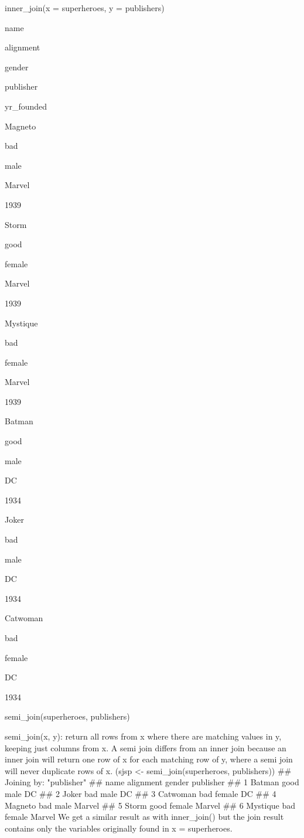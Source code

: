inner_join(x = superheroes, y = publishers)
 


name
 
alignment
 
gender
 
publisher
 
yr_founded
 



Magneto
 
bad
 
male
 
Marvel
 
1939
 


Storm
 
good
 
female
 
Marvel
 
1939
 


Mystique
 
bad
 
female
 
Marvel
 
1939
 


Batman
 
good
 
male
 
DC
 
1934
 


Joker
 
bad
 
male
 
DC
 
1934
 


Catwoman
 
bad
 
female
 
DC
 
1934
 



semi_join(superheroes, publishers)
 

semi_join(x, y): return all rows from x where there are matching values in y, keeping just columns from x. A semi join differs from an inner join because an inner join will return one row of x for each matching row of y, where a semi join will never duplicate rows of x.
 (sjsp <- semi_join(superheroes, publishers)) ## Joining by: "publisher" ##       name alignment gender publisher
## 1   Batman      good   male        DC
## 2    Joker       bad   male        DC
## 3 Catwoman       bad female        DC
## 4  Magneto       bad   male    Marvel
## 5    Storm      good female    Marvel
## 6 Mystique       bad female    Marvel 
We get a similar result as with inner_join() but the join result contains only the variables originally found in x = superheroes.
 



